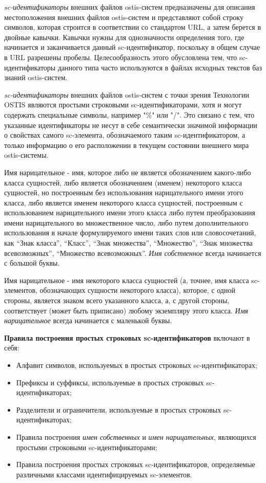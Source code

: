 \textit{sc-идентификаторы} внешних файлов ostis-систем предназначены для описания местоположения внешних файлов ostis-систем и представляют собой строку символов, которая строится в соответствии со стандартом URL, а затем берется в двойные кавычки. Кавычки нужны для однозначности определения того, где начинается и заканчивается данный sc-идентификатор, поскольку в общем случае в URL разрешены пробелы. Целесообразность этого обусловлена тем, что sc-идентификаторы данного типа часто используются в файлах исходных текстов баз знаний ostis-систем.

\textit{sc-идентификаторы} внешних файлов ostis-систем с точки зрения Технологии OSTIS являются простыми строковыми sc-идентификаторами, хотя и могут содержать специальные символы, например "\%" или "/". Это связано с тем, что указанные идентификаторы не несут в себе семантически значимой информации о свойствах самого sc-элемента, обозначаемого таким sc-идентификатором, а только информацию о его расположении в текущем состоянии внешнего мира ostis-системы.


Имя нарицательное - имя, которое либо не является обозначением какого-либо класса сущностей, либо является обозначением (именем) некоторого класса сущностей, но построенным без использования нарицательного имени этого класса, либо является именем некоторого класса сущностей, построенным с использованием нарицательного имени этого класса либо путем преобразования имени нарицательного во множественное число, либо путем дополнительного использования в начале формулируемого имени таких слов или словосочетаний, как ``Знак класса'', ``Класс'', ``Знак множества'', ``Множество'', ``Знак множества всевозможных'', ``Множество всевозможных''. \textit{Имя собственное} всегда начинается с большой буквы.

Имя нарицательное - имя некоторого класса сущностей (а, точнее, имя класса sc-элементов, обозначающих сущности некоторого класса), которое, с одной стороны, является знаком всего указанного класса, а, с другой стороны, соответствует (может быть приписано) любому экземпляру этого класса. \textit{Имя нарицательное} всегда начинается с маленькой буквы.

\textbf{Правила построения простых строковых sc-идентификаторов} включают в себя:
\begin{itemize}
	\item Алфавит символов, используемых в простых строковых sc-идентификаторах;
	\item Префиксы и суффиксы, используемые в простых строковых sc-идентификаторах;
	\item Разделители и ограничители, используемые в простых строковых sc-идентификаторах;
	\item Правила построения \textit{имен собственных} и \textit{имен нарицательных}, являющихся простыми строковыми sc-идентификаторами;
	\item Правила построения простых строковых sc-идентификаторов, определяемые различными классами идентифицируемых sc-элементов.
\end{itemize}

